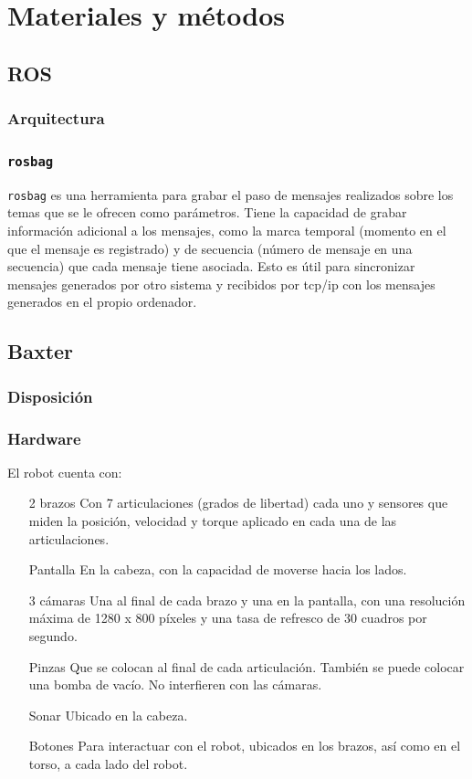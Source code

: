 \chapter{Materiales y métodos}
\section{ROS}
\subsection{Arquitectura}
\subsection{\texttt{rosbag}}
\label{subsec:metodos/rosbag}
\verb|rosbag| es una herramienta para grabar el paso de mensajes realizados sobre los temas que se le ofrecen como parámetros. Tiene la capacidad de grabar información adicional a los mensajes, como la marca temporal (momento en el que el mensaje es registrado) y de secuencia (número de mensaje en una secuencia) que cada mensaje tiene asociada. Esto es útil para sincronizar mensajes generados por otro sistema y recibidos por tcp/ip con los mensajes generados en el propio ordenador.
\section{Baxter}
\subsection{Disposición}
\subsection{Hardware}
El robot cuenta con:

\begin{itemize}
\item [2 brazos] Con 7 articulaciones (grados de libertad) cada uno y sensores que miden la posición, velocidad y torque aplicado en cada una de las articulaciones.
\item [Pantalla] En la cabeza, con la capacidad de moverse hacia los lados.
\item [3 cámaras] Una al final de cada brazo y una en la pantalla, con una resolución máxima de 1280 x 800 píxeles y una tasa de refresco de 30 cuadros por segundo. 
\item [Pinzas] Que se colocan al final de cada articulación. También se puede colocar una bomba de vacío. No interfieren con las cámaras.
\item [Sonar] Ubicado en la cabeza.
\item [Botones] Para interactuar con el robot, ubicados en los brazos, así como en el torso, a cada lado del robot.
\item []
\end{itemize}

